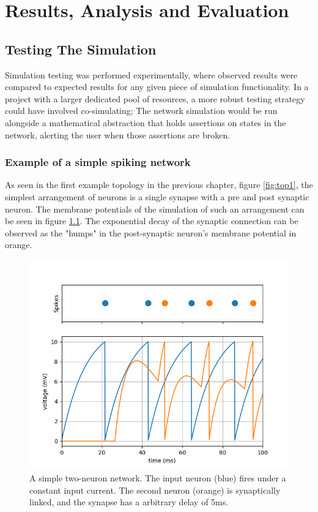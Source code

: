 \chapter{Results, Analysis and Evaluation}

\section{Testing The Simulation}

Simulation testing was performed experimentally, where observed results were
compared to expected results for any given piece of simulation functionality. In
a project with a larger dedicated pool of resources, 
a more robust testing strategy could have involved co-simulating; The
network simulation would be run alongside a mathematical abstraction that holds
assertions on states in the network, alerting the user when those assertions
are broken.

\subsection{Example of a simple spiking network}

As seen in the first example topology in the previous chapter, figure
\ref{fig:top1}, the simplest arrangement of neurons is a single synapse with a
pre and post synaptic neuron. The membrane potentials of the simulation of such
an arrangement can be seen in figure \ref{fig:PRERES1}. The exponential decay of
the synaptic connection can be observed as the "humps" in the post-synaptic
neuron's membrane potential in orange.

\begin{figure}[h!]
    \centering
    \includegraphics[width=0.7\linewidth]{figures/graphs/DelayBugFixed.png}
    \caption[A simple two-neuron network]{A simple two-neuron network. The input neuron (blue) fires under a constant input current. The second neuron (orange) is synaptically linked, and the synapse has a arbitrary delay of 5ms.}
    \label{fig:PRERES1}
\end{figure}
\FloatBarrier

